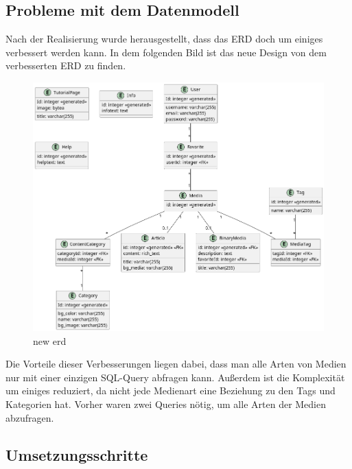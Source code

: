 \begin{spacing}{1}
    \section{Probleme mit dem Datenmodell}
    Nach der Realisierung wurde herausgestellt, dass das ERD doch um einiges verbessert werden kann. In dem folgenden Bild ist das neue Design von dem verbesserten ERD zu finden.
    \begin{figure}[H]
        \centering
        \includegraphics[width=\textwidth]{./pics/new-erd}
        \caption{new erd}
    \end{figure}

    Die Vorteile dieser Verbesserungen liegen dabei, dass man alle Arten von Medien nur mit einer einzigen SQL-Query abfragen kann. Außerdem ist die Komplexität um einiges reduziert, da nicht jede Medienart eine Beziehung zu den Tags und Kategorien hat.
    Vorher waren zwei Queries nötig, um alle Arten der Medien abzufragen.

    \subsection{Umsetzungsschritte}


\end{spacing}
